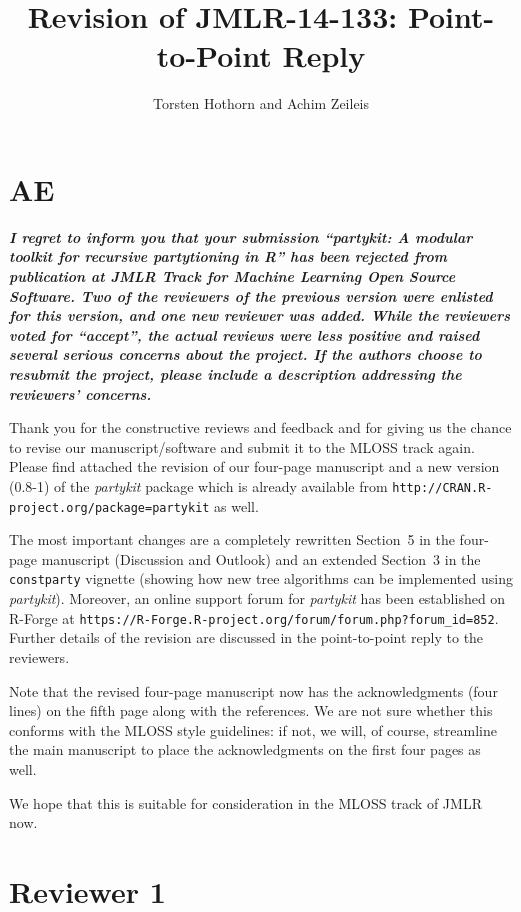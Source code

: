 \documentclass{article}
\title{Revision of JMLR-14-133: Point-to-Point Reply}
\author{Torsten Hothorn and Achim Zeileis}
\begin{document}
\maketitle

\section*{AE}

\textbf{\textit{%
I regret to inform you that your submission ``partykit: A modular toolkit
for recursive partytioning in R'' has been rejected from publication at JMLR
Track for Machine Learning Open Source Software.  Two of the reviewers of
the previous version were enlisted for this version, and one new reviewer
was added.  While the reviewers voted for ``accept'', the actual reviews
were less positive and raised several serious concerns about the project. 
If the authors choose to resubmit the project, please include a description
addressing the reviewers' concerns.
}}

\smallskip

Thank you for the constructive reviews and feedback and for giving us the
chance to revise our manuscript/software and submit it to the MLOSS track
again. Please find attached the revision of our four-page manuscript
and a new version (0.8-1) of the \emph{partykit} package which is already
available from \texttt{http://CRAN.R-project.org/package=partykit} as well.

The most important changes are a completely rewritten Section~5 in the four-page
manuscript (Discussion and Outlook) and an extended Section~3 in the \texttt{constparty}
vignette (showing how new tree algorithms can be implemented using \emph{partykit}).
Moreover, an online support forum for \emph{partykit} has been established
on \textsf{R}-Forge at \texttt{https://R-Forge.R-project.org/forum/forum.php?forum\_id=852}.
Further details of the revision are discussed in the point-to-point reply
to the reviewers.

Note that the revised four-page manuscript now has the acknowledgments (four lines)
on the fifth page along with the references. We are not sure whether this
conforms with the MLOSS style guidelines: if not, we will, of course, streamline
the main manuscript to place the acknowledgments on the first four pages as well.

We hope that this is suitable for consideration in the MLOSS track of JMLR now.

\section*{Reviewer 1}
\end{document}
